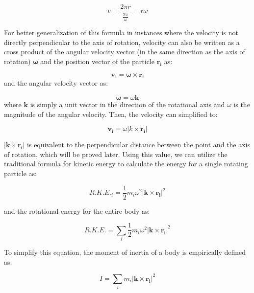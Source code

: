 \begin{equation}
v = \frac{2\pi r}{\frac{2\pi}{\omega}} = r\omega
\label{eq:v_and_w}
\end{equation}

For better generalization of this formula in instances where the velocity is not directly perpendicular to the axis of rotation, velocity can also be written as a cross product of the angular velocity vector (in the same direction as the axis of rotation) $\bm{\omega}$ and the position vector of the particle $\bm{r_i}$ as:

\begin{equation}
\bm{v_i} = \bm{\omega} \times \bm{r_i}
\end{equation}
and the angular velocity vector as:

\begin{equation}
\bm{\omega} = \omega \bm{k}
\end{equation}
where $\bm{k}$ is simply a unit vector in the direction of the rotational axis and $\omega$ is the magnitude of the angular velocity. Then, the velocity can simplified to:

\begin{equation}
\bm{v_i} = \omega |k \times \bm{r_i}|
\end{equation}

$|\bm{k} \times \bm{r_i}|$ is equivalent to the perpendicular distance between the point and the axis of rotation, which will be proved later. Using this value, we can utilize the traditional formula for kinetic energy to calculate the energy for a single rotating particle as:

\begin{equation}
R.K.E._i = \frac{1}{2}m_i\omega^2 |\bm{k} \times \bm{r_i}|^2
\label{eq:particle_rotational_energy}
\end{equation}

and the rotational energy for the entire body as:

\begin{equation}
R.K.E. = \sum_i \frac{1}{2}m_i\omega^2 |\bm{k} \times \bm{r_i}|^2
\label{eq:total_rotational_energy}
\end{equation}

To simplify this equation, the moment of inertia of a body is empirically defined as:

\begin{equation}
I = \sum_i m_i|\bm{k} \times \bm{r_i}|^2
\label{eq:total_moment_inertia}
\end{equation}

